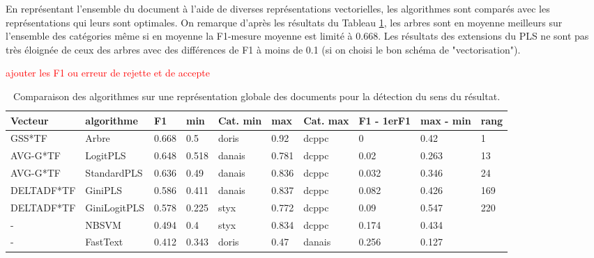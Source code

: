 En représentant l'ensemble du document à l'aide de diverses représentations vectorielles, les algorithmes sont comparés avec les représentations qui leurs sont optimales. On remarque d'après les résultats du Tableau \ref{tab:sensrst:global}, les arbres sont en moyenne meilleurs sur l'ensemble des catégories même si en moyenne la F1-mesure moyenne est limité à 0.668. Les résultats des extensions du PLS ne sont pas très éloignée de ceux des arbres avec des différences de F1 à moins de 0.1 (si on choisi le bon schéma de "vectorisation").

\begin{table}[!htb]	
	\tiny
	
	\textcolor{red}{ajouter les F1 ou erreur de rejette et de accepte}
	
	\begin{tabular}{|l|l|l|l|l|l|l|l|l|l|}
		\hline
		\textbf{Vecteur} & \textbf{algorithme} & \textbf{F1} & \textbf{min} & \textbf{Cat. min} & \textbf{max} & \textbf{Cat. max} & \textbf{F1 - 1erF1} & \textbf{max - min} & \textbf{rang} \\ \hline
		GSS*TF           & Arbre               & 0.668       & 0.5          & doris             & 0.92         & dcppc             & 0                   & 0.42               & 1             \\ \hline
		AVG-G*TF         & LogitPLS            & 0.648       & 0.518        & danais            & 0.781        & dcppc             & 0.02                & 0.263              & 13            \\ \hline
		AVG-G*TF         & StandardPLS         & 0.636       & 0.49         & danais            & 0.836        & dcppc             & 0.032               & 0.346              & 24            \\ \hline
		DELTADF*TF       & GiniPLS             & 0.586       & 0.411        & danais            & 0.837        & dcppc             & 0.082               & 0.426              & 169           \\ \hline
		DELTADF*TF       & GiniLogitPLS        & 0.578       & 0.225        & styx              & 0.772        & dcppc             & 0.09                & 0.547              & 220           \\ \hline
		-                & NBSVM               & 0.494       & 0.4          & styx              & 0.834        & dcppc             & 0.174               & 0.434              &               \\ \hline
		-                & FastText            & 0.412       & 0.343        & doris             & 0.47         & danais            & 0.256               & 0.127              &               \\ \hline
	\end{tabular}
\caption{Comparaison des algorithmes sur une représentation globale des documents pour la détection du sens du résultat.}\label{tab:sensrst:global}
\end{table}

